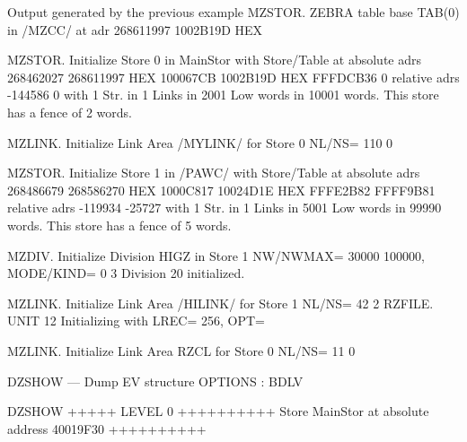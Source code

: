 \begin{Listing}{Output generated by the previous example}
MZSTOR.  ZEBRA table base TAB(0) in /MZCC/ at adr   268611997    1002B19D HEX

MZSTOR.  Initialize Store  0  in MainStor
         with Store/Table at absolute adrs   268462027   268611997
                                       HEX    100067CB    1002B19D
                                       HEX    FFFDCB36           0
                             relative adrs     -144586           0
         with     1 Str. in     1 Links in   2001 Low words in   10001 words.
         This store has a fence of    2 words.

MZLINK.  Initialize Link Area  /MYLINK/  for Store  0 NL/NS=   110     0

MZSTOR.  Initialize Store  1  in /PAWC/  
         with Store/Table at absolute adrs   268486679   268586270
                                       HEX    1000C817    10024D1E
                                       HEX    FFFE2B82    FFFF9B81
                             relative adrs     -119934      -25727
         with     1 Str. in     1 Links in   5001 Low words in   99990 words.
         This store has a fence of    5 words.

MZDIV.   Initialize Division  HIGZ      in Store  1
         NW/NWMAX=  30000 100000,  MODE/KIND=  0  3
         Division 20 initialized.

MZLINK.  Initialize Link Area  /HILINK/  for Store  1 NL/NS=    42     2
RZFILE. UNIT     12 Initializing with LREC=   256, OPT=  

MZLINK.  Initialize Link Area  RZCL      for Store  0 NL/NS=    11     0
                                                                                                                                 
DZSHOW --- Dump EV structure                                                                       OPTIONS : BDLV                
                                                                                                                                 
DZSHOW  +++++ LEVEL     0 ++++++++++            Store  MainStor at absolute address 40019F30      ++++++++++                     
                                                                                                                                 

\end{Listing}
